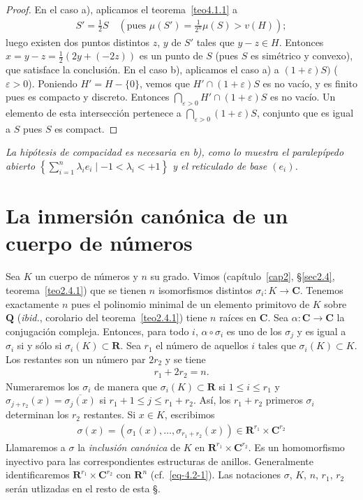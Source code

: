 \documentclass[oneside,bibtotoc,leqno,spanish]{amsbook}
\newcommand{\RR}{\mathbf{R}}
\newcommand{\QQ}{\mathbf{Q}}
\newcommand{\CC}{\mathbf{C}}
\newcommand{\QED}{}%
\newcommand{\oline}[1]{\overline{#1}}
\renewcommand{\to}[1][]{\xrightarrow{#1}}
\numberwithin{equation}{section}
\newenvironment{comm}%
	{\begin{trivlist}\item\small\itshape}
	{\end{trivlist}}
\theoremstyle{defi}
\theoremstyle{note}
\theoremstyle{rem}
\numberwithin{theorem}{section}
\numberwithin{proposition}{section}
\numberwithin{definition}{section}
\numberwithin{lemma}{section}
\numberwithin{corollary}{section}
\numberwithin{example}{section}
\numberwithin{footnote}{section}%
\begin{document}
\begin{proof}
En el caso a), aplicamos el teorema~\ref{teo4.1.1} a
\begin{gather*}
S'=\frac{1}{2}S\quad\left(\text{pues }\mu(S')=\frac{1}{2^{n}}\mu(S)>v(H)\right);
\end{gather*}
luego existen dos puntos distintos $z$, $y$ de $S'$ tales que $y-z\in H$. Entonces
$x=y-z=\frac{1}{2}(2y+(-2z))$ es un punto de $S$ (pues $S$ es sim\'etrico y convexo),
que satisface la conclusi\'on. En el caso b), aplicamos el caso a) a
$(1+\varepsilon)S)$ ($\varepsilon > 0$). Poniendo $H' = H-\{0\}$, vemos que
$H'\cap (1+\varepsilon)S$ es no vac\'io, y es finito pues es compacto y discreto. Entonces
$\bigcap_{\varepsilon>0}H'\cap (1+\varepsilon)S$ es no vac\'io. Un elemento de esta intersecci\'on pertenece
a $\bigcap_{\varepsilon>0}(1+\varepsilon)S$, conjunto que es igual a $S$ pues $S$ es compact. \QED
\end{proof}

\begin{comm}
La hip\'otesis de compacidad es necesaria en b), como lo muestra el paralep\'ipedo abierto
$\left\{\sum_{i=1}^{n}\lambda_{i}e_{i}\mid-1<\lambda_{i}<+1\right\}$ y el reticulado de base $(e_{i})$.
\end{comm}

\section{La inmersi\'on can\'onica de un cuerpo de n\'umeros}\label{sec4.2}

Sea $K$ un cuerpo de n\'umeros y $n$ su grado. Vimos
(cap\'itulo~\ref{cap2}, \S\ref{sec2.4}, teorema~\ref{teo2.4.1}) que se tienen $n$
isomorfismos distintos $\sigma_{i}:K\to\CC$. Tenemos exactamente $n$ pues el polinomio minimal de
un elemento primitovo de $K$ sobre $\QQ$ ({\em ibid.}, corolario del teorema~\ref{teo2.4.1}) tiene $n$ ra\'ices en $\CC$. Sea
$\alpha:\CC\to\CC$ la conjugaci\'on compleja. Entonces, para todo $i$, $\alpha\circ\sigma_{i}$ es uno
de los $\sigma_{j}$ y es igual a $\sigma_{i}$ si y s\'olo si $\sigma_{i}(K)\subset\RR$. Sea $r_{1}$ el n\'umero
de aquellos $i$ tales que $\sigma_{i}(K)\subset K$. Los restantes son un n\'umero par $2r_{2}$ y
se tiene
\begin{gather}\label{eq-4.2-1}
r_{1}+2r_{2}=n.
\end{gather}
Numeraremos los $\sigma_{i}$ de manera que $\sigma_{i}(K)\subset\RR$ si $1\leq i\leq r_{1}$ y
$\sigma_{j+r_{2}}(x) = \oline{\sigma_{j}(x)}$ si $r_{1}+1\leq j\leq r_{1}+r_{2}$. As\'i, los $r_{1}+r_{2}$
primeros $\sigma_{i}$ determinan los $r_{2}$ restantes. Si $x\in K$, escribimos
\begin{gather}
\sigma(x) = (\sigma_{1}(x),\dots,\sigma_{r_{1}+r_{2}}(x))\in\RR^{r_{1}}\times\CC^{r_{2}}
\end{gather}
Llamaremos a $\sigma$ la {\em inclusi\'on can\'onica} de $K$ en $\RR^{r_{1}}\times\CC^{r_{2}}$. Es un
homomorfismo inyectivo para las correspondientes estructuras de anillos. Generalmente identificaremos
$\RR^{r_{1}}\times\CC^{r_{2}}$ con $\RR^{n}$ (cf.~\eqref{eq-4.2-1}). Las notaciones $\sigma$, $K$, $n$, $r_{1}$, $r_{2}$
ser\'an utlizadas en el resto de esta \S.
\end{document}
